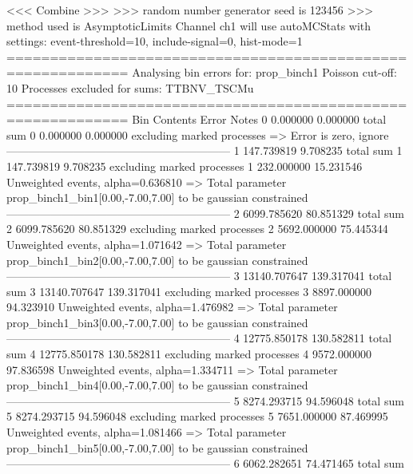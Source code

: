  <<< Combine >>> 
>>> random number generator seed is 123456
>>> method used is AsymptoticLimits
Channel ch1 will use autoMCStats with settings: event-threshold=10, include-signal=0, hist-mode=1
============================================================
Analysing bin errors for: prop_binch1
Poisson cut-off: 10
Processes excluded for sums: TTBNV_TSCMu
============================================================
Bin        Contents        Error           Notes                         
0          0.000000        0.000000        total sum                     
0          0.000000        0.000000        excluding marked processes    
  => Error is zero, ignore      
------------------------------------------------------------
1          147.739819      9.708235        total sum                     
1          147.739819      9.708235        excluding marked processes    
1          232.000000      15.231546       Unweighted events, alpha=0.636810
  => Total parameter prop_binch1_bin1[0.00,-7.00,7.00] to be gaussian constrained
------------------------------------------------------------
2          6099.785620     80.851329       total sum                     
2          6099.785620     80.851329       excluding marked processes    
2          5692.000000     75.445344       Unweighted events, alpha=1.071642
  => Total parameter prop_binch1_bin2[0.00,-7.00,7.00] to be gaussian constrained
------------------------------------------------------------
3          13140.707647    139.317041      total sum                     
3          13140.707647    139.317041      excluding marked processes    
3          8897.000000     94.323910       Unweighted events, alpha=1.476982
  => Total parameter prop_binch1_bin3[0.00,-7.00,7.00] to be gaussian constrained
------------------------------------------------------------
4          12775.850178    130.582811      total sum                     
4          12775.850178    130.582811      excluding marked processes    
4          9572.000000     97.836598       Unweighted events, alpha=1.334711
  => Total parameter prop_binch1_bin4[0.00,-7.00,7.00] to be gaussian constrained
------------------------------------------------------------
5          8274.293715     94.596048       total sum                     
5          8274.293715     94.596048       excluding marked processes    
5          7651.000000     87.469995       Unweighted events, alpha=1.081466
  => Total parameter prop_binch1_bin5[0.00,-7.00,7.00] to be gaussian constrained
------------------------------------------------------------
6          6062.282651     74.471465       total sum                     
